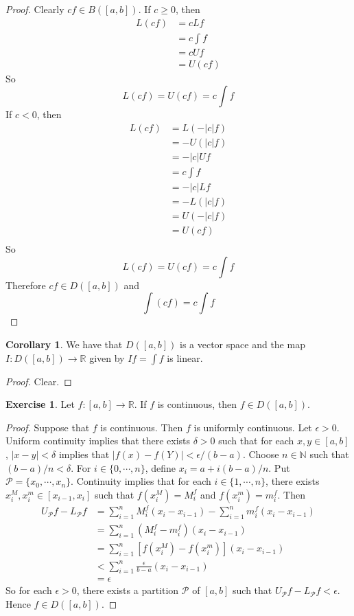 \documentclass{book}
\theoremstyle{definition}
\newtheorem{cor}[definition]{Corollary}
\newtheorem{ex}[definition]{Exercise}
\newcommand{\del}{\delta}
\newcommand{\ep}{\epsilon}
\newcommand{\N}{\mathbb{N}}
\newcommand{\R}{\mathbb{R}}
\newcommand{\MP}{\mathcal{P}}
\newcommand{\lex}[1]{\label{ex:#1}}
\DeclareMathOperator*{\0}{\mbf{0}}
\DeclareMathOperator*{\1}{\mbf{1}}
\begin{document}
	\begin{proof}
		Clearly $cf \in B([a,b])$. If $c \geq 0$, then 
		\begin{align*}
			L (cf) 
			&= c Lf \\
			&= c \int f \\
			&= c Uf \\
			&= U(cf)
		\end{align*} 
		So $$L(cf) = U(cf) = c \int f$$ If $c <0$, then 
		\begin{align*}
			L (cf) 
			&= L(-|c| f) \\
			&= -U(|c|f) \\
			&= - |c|Uf \\
			&= c \int f \\
			&= -|c| L f \\
			&= - L(|c|f) \\
			&= U(-|c|f) \\
			&= U (c f) \\
		\end{align*} 
		So $$L(cf) = U(cf) = c \int f$$ Therefore $cf \in D([a,b])$ and $$\int (cf) = c \int f$$
	\end{proof}

	\begin{cor}
		We have that $D([a,b])$ is a vector space and the map $I: D([a,b]) \rightarrow \R$ given by $If = \int f$ is linear.
	\end{cor}

	\begin{proof}
		Clear.
	\end{proof}

	\begin{ex} \lex{00000} 
		Let $f:[a,b] \rightarrow \R$. If $f$ is continuous, then $f \in D([a,b])$. 
	\end{ex}

	\begin{proof}
		Suppose that $f$ is continuous. Then $f$ is uniformly continuous. Let $\ep >0$. Uniform continuity implies that there exists $\del > 0$ such that for each $x, y \in [a,b]$, $|x-y| < \del$ implies that $|f(x) - f(Y)| < \ep/(b-a)$. Choose $n \in \N$ such that $(b-a)/n < \del$. For $i \in \{0, \cdots, n\}$, define $x_i = a + i(b-a)/n$. Put $\MP = \{x_0, \cdots, x_n\}$. Continuity implies that for each $i \in \{1, \cdots, n\}$, there exists $x_i^M, x_i^m \in [x_{i-1}, x_i]$ such that $f(x_i^M) = M_i^f$ and $f(x_i^m) = m_i^f$. Then 
		\begin{align*}
			U_\MP f - L_\MP f 
			&= \sum_{i=1}^n M^f_i(x_i - x_{i-1}) - \sum_{i=1}^n m^f_i(x_i - x_{i-1}) \\
			&= \sum_{i=1}^n (M^f_i - m^f_i)(x_i - x_{i-1}) \\
			&= \sum_{i=1}^n [f(x_i^M) - f(x_i^m)](x_i - x_{i-1}) \\
			& < \sum_{i=1}^n \frac{\ep}{b-a}(x_i - x_{i-1}) \\
			&= \ep 
		\end{align*}
		So for each $\ep >0$, there exists a partition $\MP$ of $[a,b]$ such that $U_\MP f - L_\MP f < \ep$. Hence $f \in D([a,b])$.
	\end{proof}
\end{document}
